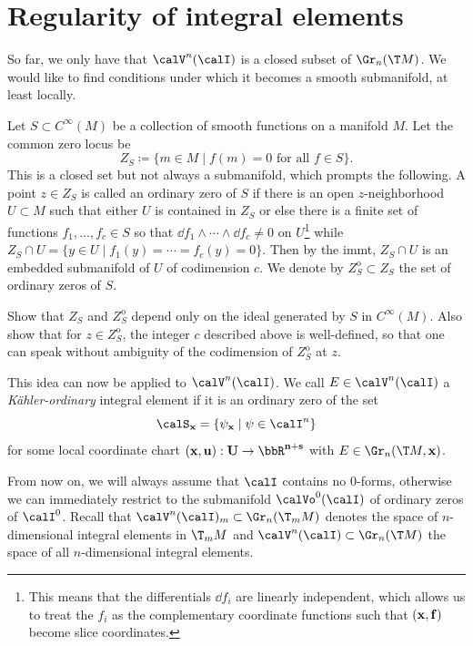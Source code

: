 \section{Regularity of integral elements}

So far, we only have that $\calV^n(\calI)$ is a closed subset of $\Gr_n(\T M)$. We would like to find conditions under which it becomes a smooth submanifold, at least locally.

\begin{defn}
    Let $S\subset C^\infty(M)$ be a collection of smooth functions on a manifold $M$. Let the common zero locus be 
    \[Z_S\coloneqq \{m\in M\mid f(m)=0\text{ for all }f\in S\}.\]
    This is a closed set but not always a submanifold, which prompts the following. A point $z\in Z_S$ is called an ordinary zero of $S$ if there is an open $z$-neighborhood $U\subset M$ such that either $U$ is contained in $Z_S$ or else there is a finite set of functions $f_1,\ldots,f_c\in S$ so that $\dd f_1\wedge\cdots\wedge\dd f_c\neq 0$ on $U$\footnote{This means that the differentials $\dd f_i$ are linearly independent, which allows us to treat the $f_i$ as the complementary coordinate functions such that $(\bf{x},\bf{f})$ become slice coordinates.} while $Z_S\cap U=\{y\in U\mid f_1(y)=\cdots =f_c(y)=0\}$. Then by the \gls{immt}, $Z_S\cap U$ is an embedded submanifold of $U$ of codimension $c$. We denote by $Z^{\mathrm{o}}_S\subset Z_S$ the set of ordinary zeros of $S$.
\end{defn}

\begin{xca}
    Show that $Z_S$ and $Z_S^{\mathrm{o}}$ depend only on the ideal generated by $S$ in $C^\infty(M)$. Also show that for $z\in Z_S^{\mathrm{o}}$, the integer $c$ described above is well-defined, so that one can speak without ambiguity of the codimension of $Z_S^{\mathrm{o}}$ at $z$.
\end{xca}

This idea can now be applied to $\calV^n(\calI)$. We call $E\in\calV^n(\calI)$ a \emph{K\"ahler-ordinary} integral element if it is an ordinary zero of the set 
\[\calS_{\bf{x}}=\{\psi_{\bf{x}}\mid \psi\in\calI^n\}\]
for some local coordinate chart $(\bf{x},\bf{u}):U\to \bbR^{n+s}$ with $E\in\Gr_n(\T M,\bf{x})$.

From now on, we will always assume that $\calI$ contains no $0$-forms, otherwise we can immediately restrict to the submanifold $\calVo^0(\calI)$ of ordinary zeros of $\calI^0$. Recall that $\calV^n(\calI)_m\subset \Gr_n(\T_m M)$ denotes the space of $n$-dimensional integral elements in $\T_m M$ and $\calV^n(\calI)\subset \Gr_n(\T M)$ the space of all $n$-dimensional integral elements. 

